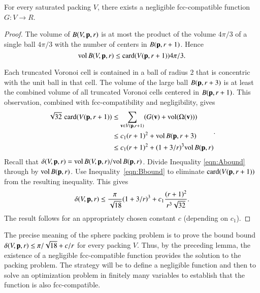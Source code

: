 \begin{conjecture}\label{conj:fcc-neg}
For every saturated packing $ V$, there exists a negligible fcc-compatible function
$G: V\to R$.
\end{conjecture}



\begin{proof}
The volume of $B( V,{\mathbf p},r)$ 
is at most the product of the volume $4\pi/3$ of a single ball $4\pi/3$ with the
number of centers in $B({\mathbf p},r+1)$.  
Hence
    \begin{equation}
    {\operatorname{vol}}\, B( V,{\mathbf p},r) \le {\operatorname{card}}( V({\mathbf p},r+1)) 4\pi/3.
    \label{eqn:Abound}
    \end{equation}

Each truncated Voronoi cell is contained in a ball of
radius $2$ that is concentric with the unit ball in that cell.  The volume
of the large ball $B({\mathbf p},r+3)$ is at least the combined volume of 
all truncated Voronoi
cells centered in $B({\mathbf p},r+1)$. This observation,
combined with fcc-compatibility and negligibility, gives
    \begin{equation}
    \begin{split}
    \sqrt{32}\,\,{\operatorname{card}}( V({\mathbf p},r+1))
    &\le \sum_{{\mathbf v}\in V({\mathbf p},r+1)} (G({\mathbf v}) +
    {\operatorname{vol}}(\Omega({\mathbf v}))) \\
    &\le c_1 (r+1)^2 + {\operatorname{vol}}\,B({\mathbf p},r+3) \\
    &\le c_1 (r+1)^2 + (1+3/r)^3 {\operatorname{vol}}\,B({\mathbf p},r)
    \label{eqn:Bbound}
    \end{split}.
    \end{equation}
%
Recall that $\delta( V,{\mathbf p},r)=
{\operatorname{vol}}\,B( V,{\mathbf p},r)/{\operatorname{vol}}\,B({\mathbf p},r)$. Divide Inequality
\ref{eqn:Abound} through by ${\operatorname{vol}}\,B({\mathbf p},r)$.  Use
Inequality~\ref{eqn:Bbound} to eliminate ${\operatorname{card}}( V({\mathbf p},r+1))$ from the
resulting inequality.  This gives
    \begin{displaymath}\delta( V,{\mathbf p},r)
        \le \frac{\pi}{\sqrt{18}} (1+3/r)^3 + c_1 \frac{(r+1)^2}{r^3\sqrt{32}}.
    \end{displaymath}
The result follows for an appropriately chosen constant $c$ (depending on $c_1$).
\end{proof}

\begin{remark} \label{remark:precise}
The precise meaning of the sphere packing problem is to prove the bound
bound $\delta( V,{\mathbf p},r) \le \pi/\sqrt{18} + c/r$ for every packing $ V$.  Thus, by the preceding lemma, the existence of a negligible
fcc-compatible function provides the solution to the packing problem. 
The strategy will be to
define a negligible function and then to solve an optimization
problem in finitely many variables to establish that the function is also
fcc-compatible.
\end{remark}



